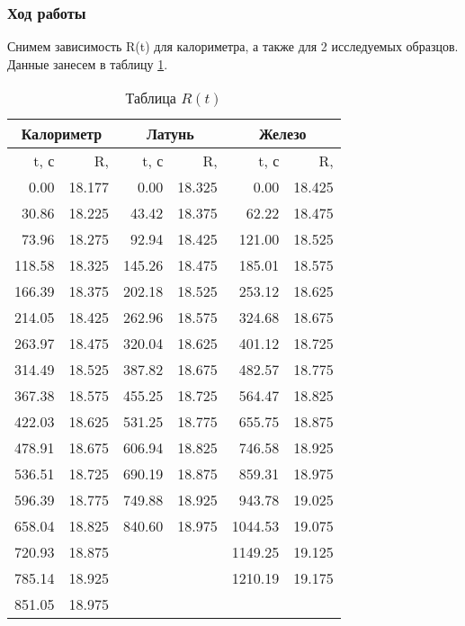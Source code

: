 \documentclass[12pt,a4paper]{article}
\begin{document}
\subsubsection*{Ход работы}
Снимем зависимость R(t) для калориметра, а также для 2 исследуемых образцов. Данные занесем в таблицу \ref{tab:data}.

\begin{table}
	\label{tab:data}
	\caption{Таблица $R(t)$}
	\centering
	\footnotesize
	\begin{tabular}{|r|r|r|r|r|r|}
		\hline 
		\multicolumn{2}{c}{Калориметр} & \multicolumn{2}{c}{Латунь} & \multicolumn{2}{c}{Железо} \\ \hline 
		
		t, с &  R, \text{ кОм}  &    t, с &  R, \text{ кОм} &    t, с &  R, \text{ кОм} \\ \hline
		0.00 & 18.177 &   0.00 & 18.325 &    0.00 & 18.425 \\ \hline
		30.86 & 18.225 &  43.42 & 18.375 &   62.22 & 18.475 \\ \hline
		73.96 & 18.275 &  92.94 & 18.425 &  121.00 & 18.525 \\ \hline
		118.58 & 18.325 & 145.26 & 18.475 &  185.01 & 18.575 \\ \hline
		166.39 & 18.375 & 202.18 & 18.525 &  253.12 & 18.625 \\ \hline
		214.05 & 18.425 & 262.96 & 18.575 &  324.68 & 18.675 \\ \hline
		263.97 & 18.475 & 320.04 & 18.625 &  401.12 & 18.725 \\ \hline
		314.49 & 18.525 & 387.82 & 18.675 &  482.57 & 18.775 \\ \hline
		367.38 & 18.575 & 455.25 & 18.725 &  564.47 & 18.825 \\ \hline
		422.03 & 18.625 & 531.25 & 18.775 &  655.75 & 18.875 \\ \hline
		478.91 & 18.675 & 606.94 & 18.825 &  746.58 & 18.925 \\ \hline
		536.51 & 18.725 & 690.19 & 18.875 &  859.31 & 18.975 \\ \hline
		596.39 & 18.775 & 749.88 & 18.925 &  943.78 & 19.025 \\ \hline
		658.04 & 18.825 & 840.60& 18.975 & 1044.53 & 19.075 \\ \hline
		720.93 & 18.875 &      &     & 1149.25 & 19.125 \\ \hline
		785.14 & 18.925 &      &     & 1210.19 & 19.175 \\ \hline
		851.05 & 18.975 &      &     &       &  \\ \hline
	\end{tabular}
\end{table}
\end{document}
